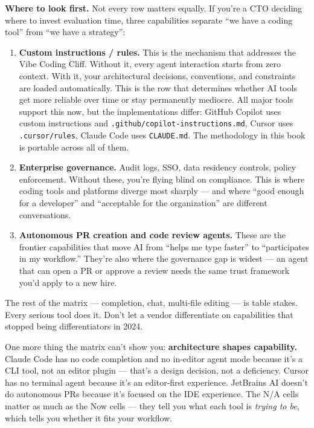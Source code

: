 \documentclass[
  a4paper,
  DIV=11,
  numbers=noendperiod]{scrreprt}
\providecommand{\tightlist}{%
  \setlength{\itemsep}{0pt}\setlength{\parskip}{0pt}}
\begin{document}
\textbf{Where to look first.} Not every row matters equally. If you're a
CTO deciding where to invest evaluation time, three capabilities
separate ``we have a coding tool'' from ``we have a strategy'':

\begin{enumerate}
\def\labelenumi{\arabic{enumi}.}
\tightlist
\item
  \textbf{Custom instructions / rules.} This is the mechanism that
  addresses the Vibe Coding Cliff. Without it, every agent interaction
  starts from zero context. With it, your architectural decisions,
  conventions, and constraints are loaded automatically. This is the row
  that determines whether AI tools get more reliable over time or stay
  permanently mediocre. All major tools support this now, but the
  implementations differ: GitHub Copilot uses custom instructions and
  \texttt{.github/copilot-instructions.md}, Cursor uses
  \texttt{.cursor/rules}, Claude Code uses \texttt{CLAUDE.md}. The
  methodology in this book is portable across all of them.
\item
  \textbf{Enterprise governance.} Audit logs, SSO, data residency
  controls, policy enforcement. Without these, you're flying blind on
  compliance. This is where coding tools and platforms diverge most
  sharply --- and where ``good enough for a developer'' and ``acceptable
  for the organization'' are different conversations.
\item
  \textbf{Autonomous PR creation and code review agents.} These are the
  frontier capabilities that move AI from ``helps me type faster'' to
  ``participates in my workflow.'' They're also where the governance gap
  is widest --- an agent that can open a PR or approve a review needs
  the same trust framework you'd apply to a new hire.
\end{enumerate}

The rest of the matrix --- completion, chat, multi-file editing --- is
table stakes. Every serious tool does it. Don't let a vendor
differentiate on capabilities that stopped being differentiators in
2024.

One more thing the matrix can't show you: \textbf{architecture shapes
capability.} Claude Code has no code completion and no in-editor agent
mode because it's a CLI tool, not an editor plugin --- that's a design
decision, not a deficiency. Cursor has no terminal agent because it's an
editor-first experience. JetBrains AI doesn't do autonomous PRs because
it's focused on the IDE experience. The N/A cells matter as much as the
Now cells --- they tell you what each tool is \emph{trying to be}, which
tells you whether it fits your workflow.
\end{document}
